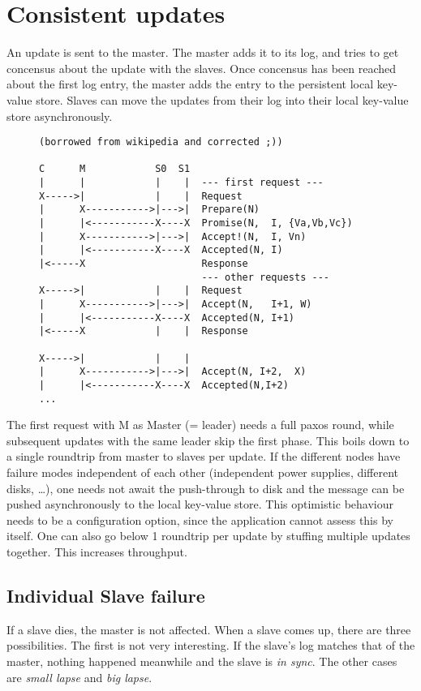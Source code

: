 
\section{Consistent updates}
An update is sent to the master.
The master adds it to its log, and tries to get concensus about the update with the slaves.
Once concensus has been reached about the first log entry,
the master  adds the entry to the persistent local key-value store.
Slaves can move the updates from their log
into their local key-value store asynchronously.

\begin{figure}
\begin{verbatim}
(borrowed from wikipedia and corrected ;))

C      M            S0  S1
|      |            |    |  --- first request ---
X----->|            |    |  Request
|      X----------->|--->|  Prepare(N)
|      |<-----------X----X  Promise(N,  I, {Va,Vb,Vc})
|      X----------->|--->|  Accept!(N,  I, Vn)
|      |<-----------X----X  Accepted(N, I)
|<-----X                    Response
                            --- other requests ---
X----->|            |    |  Request
|      X----------->|--->|  Accept(N,   I+1, W)
|      |<-----------X----X  Accepted(N, I+1)
|<-----X            |    |  Response

X----->|            |    |
|      X----------->|--->|  Accept(N, I+2,  X)
|      |<-----------X----X  Accepted(N,I+2)
...
\end{verbatim}
\end{figure}
The first request with M as Master (= leader) needs a full paxos round,
while subsequent updates with the same leader skip the first phase.
This boils down to a single roundtrip from master to slaves per update.
If the different nodes have failure modes independent of each other (independent power supplies, different disks, \ldots),
one needs not await the push-through to disk and the message can be pushed asynchronously to the local key-value store.
This optimistic behaviour needs to be a configuration option, since the application cannot assess this by itself.
One can also go below 1 roundtrip per update by stuffing multiple updates together.
This increases throughput.


\subsection{Individual Slave failure}
If a slave dies, the master is not affected.
When a slave comes up, there are three possibilities. 
The first is not very interesting. If the slave's log matches that of the master, nothing happened meanwhile and the slave is \emph{in sync}. 
The other cases are \emph{small lapse} and \emph{big lapse}.
